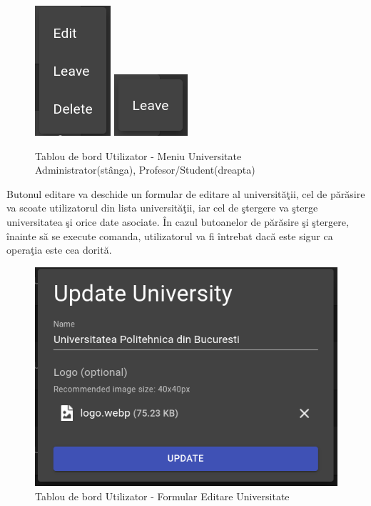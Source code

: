 \documentclass[12pt, a4paper, oneside, romanian]{teza-upb}
\begin{document}
\begin{figure}[H]
\centering
\includegraphics*[width=0.15\columnwidth]{tablou-de-bord-utilizator-meniu-universitate-administrator}
\includegraphics*[width=0.15\columnwidth]{tablou-de-bord-utilizator-meniu-universitate-profesor-student}
\caption{Tablou de bord Utilizator - Meniu Universitate Administrator(stânga), Profesor/Student(dreapta)}
\label{tablou-de-bord-utilizator-meniu-universitate}
\end{figure}

Butonul editare va deschide un formular de editare al universităţii, cel de părăsire va scoate utilizatorul din lista universităţii, iar cel de ştergere va şterge universitatea şi orice date asociate. În cazul butoanelor de părăsire şi ştergere, înainte să se execute comanda, utilizatorul va fi întrebat dacă este sigur ca operaţia este cea dorită.

\begin{figure}[H]
\centering
\includegraphics*[width=0.6\columnwidth]{tablou-de-bord-utilizator-formular-editare-universitate}
\caption{Tablou de bord Utilizator - Formular Editare Universitate}
\label{tablou-de-bord-utilizator-formular-editare-universitate}
\end{figure}
\end{document}
